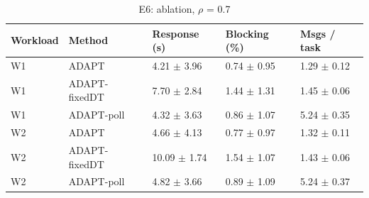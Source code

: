 \begin{table}[t]
\centering
\footnotesize
\caption{E6: ablation, $\rho$ = 0.7}
\label{tab:e6}
\begin{tabular}{lllll}
\toprule
Workload & Method & Response (s) & Blocking (\%) & Msgs / task \\
\midrule
W1 & ADAPT & 4.21 $\pm$ 3.96 & 0.74 $\pm$ 0.95 & 1.29 $\pm$ 0.12 \\
W1 & ADAPT-fixedDT & 7.70 $\pm$ 2.84 & 1.44 $\pm$ 1.31 & 1.45 $\pm$ 0.06 \\
W1 & ADAPT-poll & 4.32 $\pm$ 3.63 & 0.86 $\pm$ 1.07 & 5.24 $\pm$ 0.35 \\
W2 & ADAPT & 4.66 $\pm$ 4.13 & 0.77 $\pm$ 0.97 & 1.32 $\pm$ 0.11 \\
W2 & ADAPT-fixedDT & 10.09 $\pm$ 1.74 & 1.54 $\pm$ 1.07 & 1.43 $\pm$ 0.06 \\
W2 & ADAPT-poll & 4.82 $\pm$ 3.66 & 0.89 $\pm$ 1.09 & 5.24 $\pm$ 0.37 \\
\bottomrule
\end{tabular}
\end{table}
